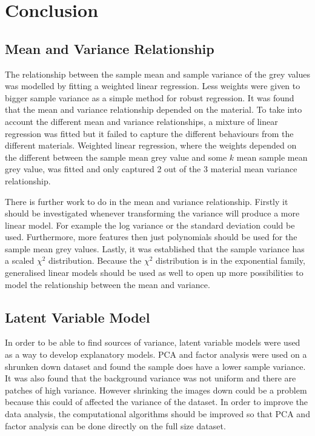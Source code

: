 \documentclass[12pt]{report}
\begin{document}
\chapter{Conclusion}

\section{Mean and Variance Relationship}
The relationship between the sample mean and sample variance of the grey values was modelled by fitting a weighted linear regression. Less weights were given to bigger sample variance as a simple method for robust regression. It was found that the mean and variance relationship depended on the material. To take into account the different mean and variance relationships, a mixture of linear regression was fitted but it failed to capture the different behaviours from the different materials. Weighted linear regression, where the weights depended on the different between the sample mean grey value and some $k$ mean sample mean grey value, was fitted and only captured 2 out of the 3 material mean variance relationship.

There is further work to do in the mean and variance relationship. Firstly it should be investigated whenever transforming the variance will produce a more linear model. For example the log variance or the standard deviation could be used. Furthermore, more features then just polynomials should be used for the sample mean grey values. Lastly, it was established that the sample variance has a scaled $\chi^2$ distribution. Because the $\chi^2$ distribution is in the exponential family, generalised linear models should be used as well to open up more possibilities to model the relationship between the mean and variance.

\section{Latent Variable Model}
In order to be able to find sources of variance, latent variable models were used as a way to develop explanatory models. PCA and factor analysis were used on a shrunken down dataset and found the sample does have a lower sample variance. It was also found that the background variance was not uniform and there are patches of high variance. However shrinking the images down could be a problem because this could of affected the variance of the dataset. In order to improve the data analysis, the computational algorithms should be improved so that PCA and factor analysis can be done directly on the full size dataset.
\end{document}

